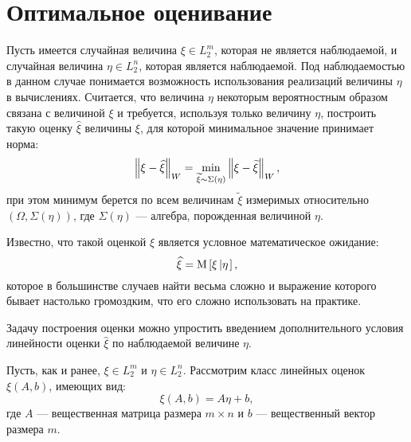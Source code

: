 \section{Оптимальное оценивание}

Пусть имеется случайная величина $\xi \in L_2^m$, которая не является наблюдаемой, и случайная величина $\eta \in L_2^n$, которая является наблюдаемой. Под наблюдаемостью
в данном случае понимается возможность использования реализаций величины $\eta$ в вычислениях. Считается, что величина $\eta$ некоторым вероятностным образом связана с
величиной $\xi$ и требуется, используя только величину $\eta$, построить такую оценку $\widehat{\xi}$ величины $\xi$, для которой минимальное значение принимает норма:
$$
	\left \| \xi - \widehat{\xi} \right \|_{W} = \min_{\widetilde{\xi} \sim \Sigma(\eta)} \left \| \xi - \widetilde{\xi}  \right \|_{W} ,
$$
при этом минимум берется по всем величинам $\widetilde{\xi}$ измеримых относительно $(\Omega, \Sigma(\eta))$, где $\Sigma(\eta)$ --- алгебра, порожденная величиной $\eta$.

Известно, что такой оценкой $\widehat{\xi}$ является условное математическое ожидание:
$$
	\widehat{\xi} = \mathrm{M} \left [ \xi \left | \eta \right . \right ] ,
$$
которое в большинстве случаев найти весьма сложно и выражение которого бывает настолько громоздким, что его сложно использовать на практике.

Задачу построения оценки можно упростить введением дополнительного условия линейности оценки $\widehat{\xi}$ по наблюдаемой величине $\eta$.

Пусть, как и ранее, $\xi \in L_2^m$ и $\eta \in L_2^n$. Рассмотрим класс линейных оценок $\xi(A,b)$, имеющих вид:
$$
	\xi(A,b) = A \eta + b ,
$$
где $A$ --- вещественная матрица размера $m \times n$ и $b$ --- вещественный вектор размера $m$.

